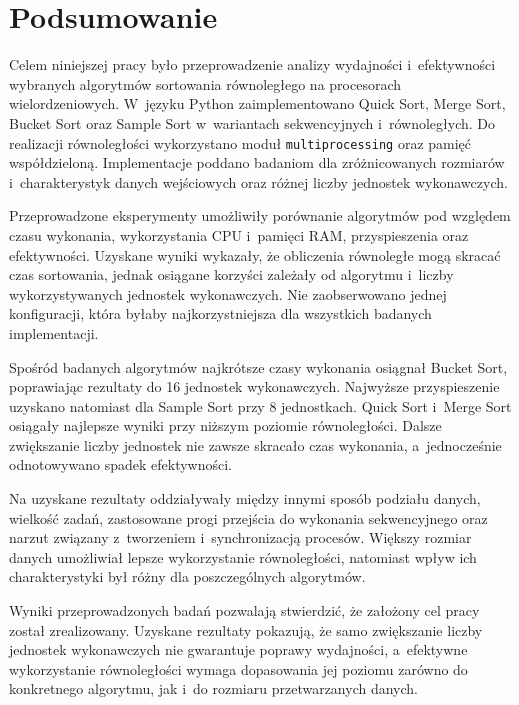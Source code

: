\cleardoublepage
\chapter*{Podsumowanie}

Celem niniejszej pracy było przeprowadzenie analizy wydajności i~efektywności wybranych algorytmów sortowania równoległego na procesorach wielordzeniowych. 
W~języku Python zaimplementowano Quick Sort, Merge Sort, Bucket Sort oraz Sample Sort w~wariantach sekwencyjnych i~równoległych. 
Do realizacji równoległości wykorzystano moduł \texttt{multiprocessing} oraz pamięć współdzieloną.
Implementacje poddano badaniom dla zróżnicowanych rozmiarów i~charakterystyk danych wejściowych oraz różnej liczby jednostek wykonawczych.

Przeprowadzone eksperymenty umożliwiły porównanie algorytmów pod względem czasu wykonania, 
wykorzystania CPU i~pamięci RAM, przyspieszenia oraz efektywności. 
Uzyskane wyniki wykazały, że obliczenia równoległe mogą skracać czas sortowania, 
jednak osiągane korzyści zależały od algorytmu i~liczby wykorzystywanych jednostek wykonawczych.
Nie zaobserwowano jednej konfiguracji, która byłaby najkorzystniejsza dla wszystkich badanych implementacji.

Spośród badanych algorytmów najkrótsze czasy wykonania osiągnał Bucket Sort, poprawiając rezultaty do 16 jednostek wykonawczych.
Najwyższe przyspieszenie uzyskano natomiast dla Sample Sort przy 8 jednostkach.
Quick Sort i~Merge Sort osiągały najlepsze wyniki przy niższym poziomie równoległości. 
Dalsze zwiększanie liczby jednostek nie zawsze skracało czas wykonania, a~jednocześnie odnotowywano spadek efektywności.

Na uzyskane rezultaty oddziaływały między innymi sposób podziału danych, wielkość zadań, 
zastosowane progi przejścia do wykonania sekwencyjnego oraz narzut związany z~tworzeniem i~synchronizacją procesów.
Większy rozmiar danych umożliwiał lepsze wykorzystanie równoległości, 
natomiast wpływ ich charakterystyki był różny dla poszczególnych algorytmów.

Wyniki przeprowadzonych badań pozwalają stwierdzić, że założony cel pracy został zrealizowany.
Uzyskane rezultaty pokazują, że samo zwiększanie liczby jednostek wykonawczych nie gwarantuje poprawy wydajności, 
a~efektywne wykorzystanie równoległości wymaga dopasowania jej poziomu zarówno do konkretnego algorytmu, jak i~do rozmiaru przetwarzanych danych.